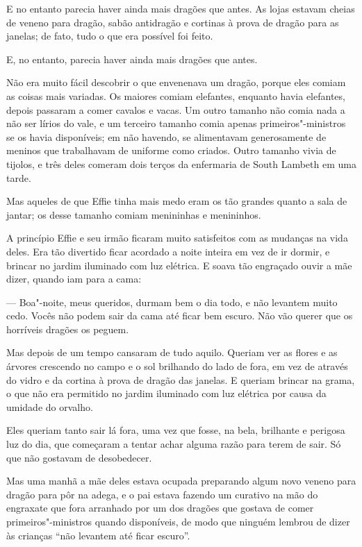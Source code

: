 E no entanto parecia haver ainda mais dragões que antes. As lojas
estavam cheias de veneno para dragão, sabão antidragão e cortinas
à prova de dragão para as janelas; de fato, tudo o que era possível
foi feito.

E, no entanto, parecia haver ainda mais dragões que antes.

Não era muito fácil descobrir o que envenenava um dragão, porque eles
comiam as coisas mais variadas. Os maiores comiam elefantes, enquanto
havia elefantes, depois passaram a comer cavalos e vacas. Um outro
tamanho não comia nada a não ser lírios do vale, e um terceiro
tamanho comia apenas primeiros"-ministros se os havia disponíveis;
em não havendo, se alimentavam generosamente de meninos que
trabalhavam de uniforme como criados. Outro tamanho vivia de tijolos,
e três deles comeram dois terços da enfermaria de South Lambeth em uma
tarde.

Mas aqueles de que Effie tinha mais medo eram os tão grandes quanto a
sala de jantar; os desse tamanho comiam menininhas e menininhos.

A princípio Effie e seu irmão ficaram muito satisfeitos com as
mudanças na vida deles. Era tão divertido ficar acordado a noite
inteira em vez de ir dormir, e brincar no jardim iluminado com luz
elétrica. E soava tão engraçado ouvir a mãe dizer, quando iam para a
cama:

--- Boa"-noite, meus queridos, durmam bem o dia todo, e não levantem
muito cedo. Vocês não podem sair da cama até ficar bem escuro. Não
vão querer que os horríveis dragões os peguem.

Mas depois de um tempo cansaram de tudo aquilo. Queriam ver as flores
e as árvores crescendo no campo e o sol brilhando do lado de fora, em
vez de através do vidro e da cortina à prova de dragão das janelas. E
queriam brincar na grama, o que não era permitido no jardim iluminado
com luz elétrica por causa da umidade do orvalho.

Eles queriam tanto sair lá fora, uma vez que fosse, na bela,
brilhante e perigosa luz do dia, que começaram a tentar achar alguma
razão para terem de sair. Só que não gostavam de desobedecer.

Mas uma manhã a mãe deles estava ocupada preparando algum novo veneno
para dragão para pôr na adega, e o pai estava fazendo um curativo na
mão do engraxate que fora arranhado por um dos dragões que gostava de
comer primeiros"-ministros quando disponíveis, de modo que ninguém
lembrou de dizer às crianças “não levantem até ficar escuro”.

